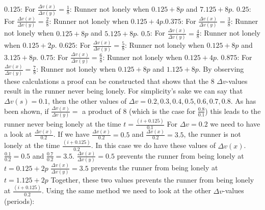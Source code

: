 \documentclass[12pt, a4paper]{article}
\begin{document}
\newline
\newline
$0.125$: For $\frac{\Delta v(x)}{\Delta v(y)} = \frac{1}{8}$: Runner not lonely when $0.125+8p$ and $7.125+8p$. \newline $0.25$: For $\frac{\Delta v(x)}{\Delta v(y)} = \frac{2}{8}$: Runner not lonely when $0.125+4p$.\newline $0.375$: For $\frac{\Delta v(x)}{\Delta v(y)} = \frac{3}{8}$: Runner not lonely when $0.125+8p$ and $5.125+8p$. \newline $0.5$: For $\frac{\Delta v(x)}{\Delta v(y)} = \frac{4}{8}$: Runner not lonely when $0.125+2p$. \newline $0.625$: For $\frac{\Delta v(x)}{\Delta v(y)} = \frac{5}{8}$: Runner not lonely when $0.125+8p$ and $3.125+8p$. \newline $0.75$: For $\frac{\Delta v(x)}{\Delta v(y)} = \frac{6}{8}$: Runner not lonely when $0.125+4p$. \newline $0.875$: For $\frac{\Delta v(x)}{\Delta v(y)} = \frac{7}{8}$: Runner not lonely when $0.125+8p$ and $1.125+8p$.
\newline
\newline
By observing these calculations a proof can be constructed that shows that the $8$ $\Delta v$-values result in the runner never being lonely. For simplicity's sake we can say that $\Delta v(s) = 0.1$, then the other values of $\Delta v = 0.2, 0.3, 0.4, 0.5, 0.6, 0.7, 0.8$.
\newline
\newline
As has been shown, if $\frac{\Delta v(x)}{\Delta v(y)} =$ a product of $8$ (which is the case for $\frac{0.8}{0.1}$) this leads to the runner never being lonely at the time $t = \frac{(i + 0.125)}{0.1}$
For $\Delta v = 0.2$ we need to have a look at $\frac{\Delta v(x)}{0.2}$. If we have $\frac{\Delta v(x)}{0.2} = 0.5$ and $\frac{\Delta v(x)}{0.2} = 3.5$, the runner is not lonely at the time $\frac{(i+0.125)}{0.2}$.
In this case we do have these values of $\Delta v(x)$. $\frac{0.1}{0.2} = 0.5$ and $\frac{0.7}{0.2} = 3.5$.
\newline
\newline
$\frac{\Delta v(x)}{\Delta v(y)} = 0.5$ prevents the runner from being lonely at $t = 0.125+2p$
$\frac{\Delta v(x)}{\Delta v(y)} = 3.5$ prevents the runner from being lonely at $t = 1.125+2p$
Together, these two values prevents the runner from being lonely at $\frac{(i+0.125)}{0.2}$. Using the same method we need to look at the other $\Delta v$-values (periods):
\newline
\end{document}
